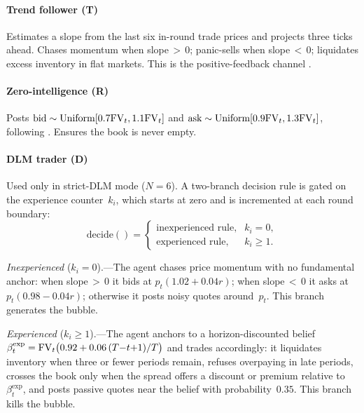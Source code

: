 \paragraph{Trend follower (T)}
Estimates a slope from the last six in-round trade prices and
projects three ticks ahead.  Chases momentum when slope$\,{>}\,0$;
panic-sells when slope$\,{<}\,0$; liquidates excess inventory in
flat markets.  This is the positive-feedback channel
\citep{delong1990positive}.

\paragraph{Zero-intelligence (R)}
Posts $\text{bid}\sim\text{Uniform}[0.7\mathrm{FV}_t,1.1\mathrm{FV}_t]$ and
$\text{ask}\sim\text{Uniform}[0.9\mathrm{FV}_t,1.3\mathrm{FV}_t]$, following
\citet{gode1993allocative}.  Ensures the book is never empty.

\paragraph{DLM trader (D)}
Used only in strict-DLM mode ($N{=}6$).  A two-branch decision rule
is gated on the experience counter~$k_i$, which starts at zero and is
incremented at each round boundary:
\begin{equation}
\text{decide}() =
\begin{cases}
\text{inexperienced rule}, & k_i = 0,\\
\text{experienced rule}, & k_i \ge 1.
\end{cases}
\label{eq:dlm-gate}
\end{equation}

\emph{Inexperienced} ($k_i{=}0$).---The agent chases price momentum
with no fundamental anchor: when slope$\,{>}\,0$ it bids at
$p_t(1.02{+}0.04r)$; when slope$\,{<}\,0$ it asks at
$p_t(0.98{-}0.04r)$; otherwise it posts noisy quotes around~$p_t$.
This branch generates the bubble.

\emph{Experienced} ($k_i{\ge}1$).---The agent anchors to a
horizon-discounted belief
$\beta_t^{\text{exp}} = \mathrm{FV}_t\bigl(0.92 + 0.06\,(T{-}t{+}1)/T\bigr)$
and trades accordingly: it liquidates inventory when three or fewer
periods remain, refuses overpaying in late periods, crosses the book
only when the spread offers a discount or premium relative to
$\beta_t^{\text{exp}}$, and posts passive quotes near the belief with
probability~$0.35$.  This branch kills the bubble.

